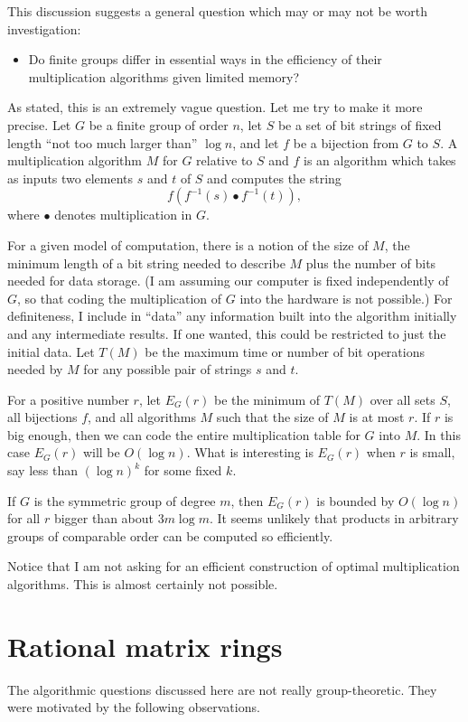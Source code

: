 \documentclass[12pt]{article}
\begin{document}
This discussion suggests a general question which may or may not be
worth investigation:

\begin{itemize}
\item Do finite groups differ in essential ways in the efficiency of
their multiplication algorithms given limited memory?
\end{itemize}

As stated, this is an extremely vague question.  Let me try to make it
more precise.  Let $G$ be a finite group of order $n$, let $S$ be a
set of bit strings of fixed length ``not too much larger than'' $\log
n$, and let $f$ be a bijection from $G$ to $S$.  A multiplication
algorithm $M$ for $G$ relative to $S$ and $f$ is an algorithm which
takes as inputs two elements $s$ and $t$ of $S$ and computes the
string
\[
f(f^{-1}(s)\bullet f^{-1}(t)),
\]
where $\bullet$ denotes multiplication in $G$.

For a given model of computation, there is a notion of the size of
$M$, the minimum length of a bit string needed to describe $M$ plus
the number of bits needed for data storage.  (I am assuming our
computer is fixed independently of $G$, so that coding the
multiplication of $G$ into the hardware is not possible.)  For
definiteness, I include in ``data'' any information built into the
algorithm initially and any intermediate results.  If one wanted, this
could be restricted to just the initial data.  Let $T(M)$ be the
maximum time or number of bit operations needed by $M$ for any
possible pair of strings $s$ and $t$.

For a positive number $r$, let $E_G(r)$ be the minimum of $T(M)$ over
all sets $S$, all bijections $f$, and all algorithms $M$ such that the
size of $M$ is at most $r$.  If $r$ is big enough, then we can code
the entire multiplication table for $G$ into $M$.  In this case
$E_G(r)$ will be $O(\log n)$.  What is interesting is $E_G(r)$ when
$r$ is small, say less than $(\log n)^k$ for some fixed $k$.

If $G$ is the symmetric group of degree $m$, then $E_G(r)$ is bounded
by $O(\log n)$ for all $r$ bigger than about $3m\log m$.  It seems
unlikely that products in arbitrary groups of comparable order can be
computed so efficiently.

Notice that I am not asking for an efficient construction of optimal
multiplication algorithms.  This is almost certainly not possible.

\section{Rational matrix rings}
The algorithmic questions discussed here are not really
group-theoretic.  They were motivated by the following observations.
\end{document}
